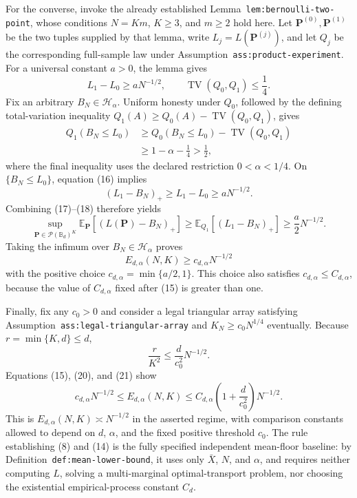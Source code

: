 For the converse, invoke the already established Lemma~\texttt{lem:bernoulli-two-point}, whose conditions \(N=Km\), \(K\geq3\), and \(m\geq2\) hold here. Let \(\mathbf P^{(0)},\mathbf P^{(1)}\) be the two tuples supplied by that lemma, write \(L_j=L(\mathbf P^{(j)})\), and let \(Q_j\) be the corresponding full-sample law under Assumption~\texttt{ass:product-experiment}. For a universal constant \(a>0\), the lemma gives
\[
L_1-L_0\geq aN^{-1/2},
\qquad
\operatorname{TV}(Q_0,Q_1)\leq\frac14. \tag{16}
\]
Fix an arbitrary \(B_N\in\mathcal H_\alpha\). Uniform honesty under \(Q_0\), followed by the defining total-variation inequality \(Q_1(A)\geq Q_0(A)-\operatorname{TV}(Q_0,Q_1)\), gives
\[
\begin{aligned}
Q_1(B_N\leq L_0)
&\geq Q_0(B_N\leq L_0)-\operatorname{TV}(Q_0,Q_1)\\
&\geq 1-\alpha-\frac14
>\frac12, \tag{17}
\end{aligned}
\]
where the final inequality uses the declared restriction \(0<\alpha<1/4\). On \(\{B_N\leq L_0\}\), equation (16) implies
\[
(L_1-B_N)_+\geq L_1-L_0\geq aN^{-1/2}. \tag{18}
\]
Combining (17)--(18) therefore yields
\[
\sup_{\mathbf P\in\mathcal P(\mathbb B_d)^K}
\mathbb E_{\mathbf P}[(L(\mathbf P)-B_N)_+]
\geq \mathbb E_{Q_1}[(L_1-B_N)_+]
\geq \frac a2N^{-1/2}. \tag{19}
\]
Taking the infimum over \(B_N\in\mathcal H_\alpha\) proves
\[
E_{d,\alpha}(N,K)\geq c_{d,\alpha}N^{-1/2} \tag{20}
\]
with the positive choice \(c_{d,\alpha}=\min\{a/2,1\}\). This choice also satisfies \(c_{d,\alpha}\leq C_{d,\alpha}\), because the value of \(C_{d,\alpha}\) fixed after (15) is greater than one.

Finally, fix any \(c_0>0\) and consider a legal triangular array satisfying Assumption~\texttt{ass:legal-triangular-array} and \(K_N\geq c_0N^{1/4}\) eventually. Because \(r=\min\{K,d\}\leq d\),
\[
\frac r{K^2}
\leq \frac d{c_0^2}N^{-1/2}. \tag{21}
\]
Equations (15), (20), and (21) show
\[
c_{d,\alpha}N^{-1/2}
\leq E_{d,\alpha}(N,K)
\leq C_{d,\alpha}\left(1+\frac d{c_0^2}\right)N^{-1/2}. \tag{22}
\]
This is \(E_{d,\alpha}(N,K)\asymp N^{-1/2}\) in the asserted regime, with comparison constants allowed to depend on \(d\), \(\alpha\), and the fixed positive threshold \(c_0\). The rule establishing (8) and (14) is the fully specified independent mean-floor baseline: by Definition~\texttt{def:mean-lower-bound}, it uses only \(\bar X\), \(N\), and \(\alpha\), and requires neither computing \(\widehat L\), solving a multi-marginal optimal-transport problem, nor choosing the existential empirical-process constant \(C_d\).
